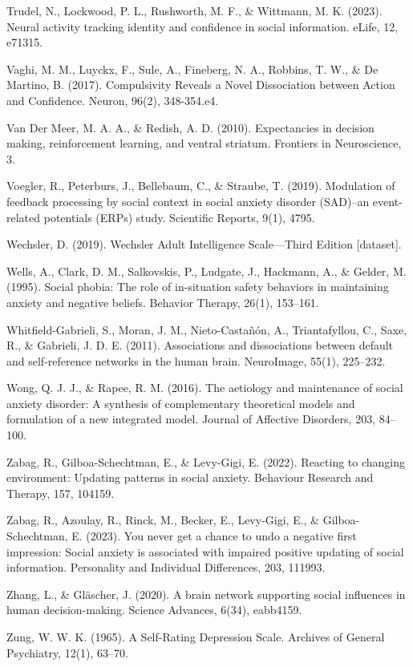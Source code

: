 \documentclass[12pt,a4paper,oneside,]{book} %
\begin{document}
Trudel, N., Lockwood, P. L., Rushworth, M. F., \& Wittmann, M. K. (2023). Neural activity tracking identity and confidence in social information. eLife, 12, e71315.

Vaghi, M. M., Luyckx, F., Sule, A., Fineberg, N. A., Robbins, T. W., \& De Martino, B. (2017). Compulsivity Reveals a Novel Dissociation between Action and Confidence. Neuron, 96(2), 348-354.e4.

Van Der Meer, M. A. A., \& Redish, A. D. (2010). Expectancies in decision making, reinforcement learning, and ventral striatum. Frontiers in Neuroscience, 3.

Voegler, R., Peterburs, J., Bellebaum, C., \& Straube, T. (2019). Modulation of feedback processing by social context in social anxiety disorder (SAD)--an event-related potentials (ERPs) study. Scientific Reports, 9(1), 4795.

Wechsler, D. (2019). Wechsler Adult Intelligence Scale---Third Edition {[}dataset{]}.

Wells, A., Clark, D. M., Salkovskis, P., Ludgate, J., Hackmann, A., \& Gelder, M. (1995). Social phobia: The role of in-situation safety behaviors in maintaining anxiety and negative beliefs. Behavior Therapy, 26(1), 153--161.

Whitfield-Gabrieli, S., Moran, J. M., Nieto-Castañón, A., Triantafyllou, C., Saxe, R., \& Gabrieli, J. D. E. (2011). Associations and dissociations between default and self-reference networks in the human brain. NeuroImage, 55(1), 225--232.

Wong, Q. J. J., \& Rapee, R. M. (2016). The aetiology and maintenance of social anxiety disorder: A synthesis of complementary theoretical models and formulation of a new integrated model. Journal of Affective Disorders, 203, 84--100.

Zabag, R., Gilboa-Schechtman, E., \& Levy-Gigi, E. (2022). Reacting to changing environment: Updating patterns in social anxiety. Behaviour Research and Therapy, 157, 104159.

Zabag, R., Azoulay, R., Rinck, M., Becker, E., Levy-Gigi, E., \& Gilboa-Schechtman, E. (2023). You never get a chance to undo a negative first impression: Social anxiety is associated with impaired positive updating of social information. Personality and Individual Differences, 203, 111993.

Zhang, L., \& Gläscher, J. (2020). A brain network supporting social influences in human decision-making. Science Advances, 6(34), eabb4159.

Zung, W. W. K. (1965). A Self-Rating Depression Scale. Archives of General Psychiatry, 12(1), 63--70.

\backmatter
\end{document}
